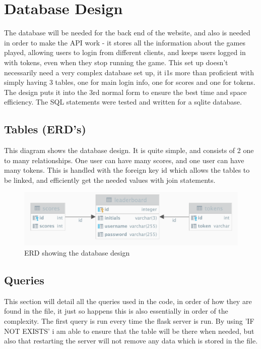 \section{Database Design}
The database will be needed for the back end of the website, and also is needed in order to make the API work - it stores all the information about the games played, allowing users to login from different clients, and keeps users logged in with tokens, even when they stop running the game. This set up doesn't necessarily need a very complex database set up, it i1s more than proficient with simply having 3 tables, one for main login info, one for scores and one for tokens. The  design puts it into the 3rd normal form to ensure the best time and space efficiency. The SQL statements were tested and written for a sqlite database.

\subsection{Tables (ERD's)}
This diagram shows the database design. It is quite simple, and consists of 2 one to many relationships. One user can have many scores, and one user can have many tokens. This is handled with the foreign key id which allows the tables to be linked, and efficiently get the needed values with join statements.

\begin{figure}[H]
  \includegraphics[width=0.8\linewidth]{Figures/leaderboard.png}
  \centering
  \caption{ERD showing the database design}
  \label{fig:ERD}
\end{figure}

\subsection{Queries}
This section will detail all the queries used in the code, in order of how they are found in the file, it just so happens this is also essentially in order of the complexity. The first query is run every time the flask server is run. By using 'IF NOT EXISTS' i am able to ensure that the table will be there when needed, but also that restarting the server will not remove any data which is stored in the file. 

